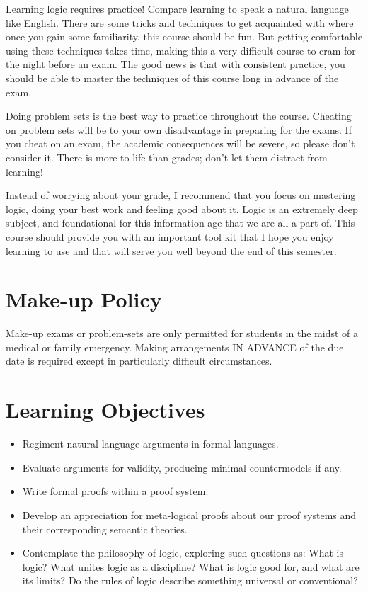 \documentclass[letterpaper]{inzane_syllabus} %
\begin{document}
Learning logic requires practice! 
Compare learning to speak a natural language like English. %
There are some tricks and techniques to get acquainted with where once you gain some familiarity, this course should be fun.
But getting comfortable using these techniques takes time, making this a very difficult course to cram for the night before an exam.
The good news is that with consistent practice, you should be able to master the techniques of this course long in advance of the exam.

Doing problem sets is the best way to practice throughout the course.
Cheating on problem sets will be to your own disadvantage in preparing for the exams.
If you cheat on an exam, the academic consequences will be severe, so please don't consider it.
There is more to life than grades; don't let them distract from learning!

Instead of worrying about your grade, I recommend that you focus on mastering logic, doing your best work and feeling good about it.
Logic is an extremely deep subject, and foundational for this information age that we are all a part of.
This course should provide you with an important tool kit that I hope you enjoy learning to use and that will serve you well beyond the end of this semester.

\vspace{0.5cm}
\section{Make-up Policy}

Make-up exams or problem-sets are only permitted for students in the midst of a medical or family emergency.
Making arrangements IN ADVANCE of the due date is required except in particularly difficult circumstances.

\vspace{0.5cm}
\section{Learning Objectives}

\begin{itemize}
  \item Regiment natural language arguments in formal languages.
  \item Evaluate arguments for validity, producing minimal countermodels if any.
  \item Write formal proofs within a proof system.
  \item Develop an appreciation for meta-logical proofs about our proof systems and their corresponding semantic theories.
  \item Contemplate the philosophy of logic, exploring such questions as: What is logic? What unites logic as a discipline? What is logic good for, and what are its limits? Do the rules of logic describe something universal or conventional?
\end{itemize}
\end{document}
